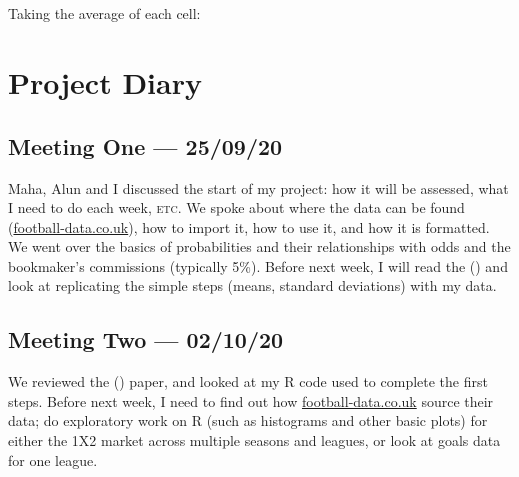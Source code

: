 \documentclass[a4paper,10pt]{report}
\begin{document}
\small
\begin{center}
\noindent{}\\
\\
\\
\\
\\
\\
\\
\\
\\
\vspace{3mm}

\noindent Taking the average of each cell:\\
\end{center}
\normalsize

\chapter{Project Diary} \label{app:diary} %
\section*{Meeting One --- 25/09/20}
Maha, Alun and I discussed the start of my project: how it will be assessed, what I need to do each week, \textsc{etc.} We spoke about where the data can be found (\url{football-data.co.uk}), how to import it, how to use it, and how it is formatted. We went over the basics of probabilities and their relationships with odds and the bookmaker's commissions (typically 5\%). Before next week, I will read the \citeauthor{kaunitz17} (\citeyear{kaunitz17}) and look at replicating the simple steps (means, standard deviations) with my data.

\section*{Meeting Two --- 02/10/20}
We reviewed the \citeauthor{kaunitz17} (\citeyear{kaunitz17}) paper, and looked at my R code used to complete the first steps. Before next week, I need to find out how \url{football-data.co.uk} source their data; do exploratory work on R (such as histograms and other basic plots) for either the 1X2 market across multiple seasons and leagues, or look at goals data for one league.
\end{document}
